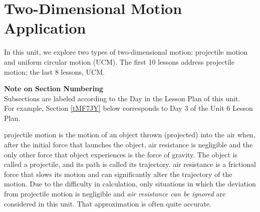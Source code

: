 \documentclass[main-physics.tex]{subfiles}
\begin{document}
\setcounter{section}{5} %
\section{Two-Dimensional Motion Application}

In this unit, we explore two types of two-dimensional motion: projectile motion and uniform circular motion (UCM). The first 10 lessons address projectile motion; the last 8 lessons, UCM.

\begin{mdframed}[backgroundcolor=cpBlue]
{\color{white}
\textcolor{csOrange}{\textbf{Note on Section Numbering}}\\
Subsections are labeled according to the Day in the Lesson Plan of this unit.\\ For example, Section \hypersetup{linkcolor=csOrange}\ref{tMF7JY} below corresponds to Day 3 of the Unit 6 Lesson Plan.
}
\end{mdframed}

\vspace{1ex}

\cyanhrule

\vspace{1em}

\Gls{projectile motion} is the motion of an object thrown (projected) into the air when, after the initial force that launches the object, air resistance is negligible and the only other force that object experiences is the force of gravity. The object is called a \gls{projectile}, and its path is called its \gls{trajectory}. \Gls{air resistance} is a frictional force that slows its motion and can significantly alter the trajectory of the motion. Due to the difficulty in calculation, only situations in which the deviation from projectile motion is negligible and \textit{air resistance can be ignored} are considered in this unit. That approximation is often quite accurate.

\vspace{1em}
\end{document}
